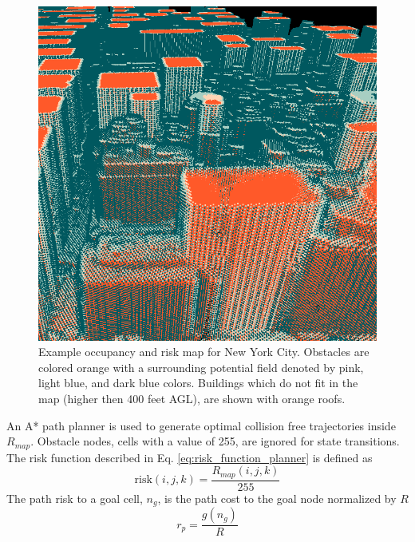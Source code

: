 \begin{figure}[ht]
  \centering
  \includegraphics[width=0.5\linewidth]{chapter_5_mapping/imgs/voxel_map_ny_2.png}
  \caption[Occupancy map of New York City]{Example occupancy and risk map for New York City. Obstacles are colored orange with a surrounding potential field denoted by pink, light blue, and dark blue colors. Buildings which do not fit in the map (higher then 400 feet AGL), are shown with orange roofs.}
  \label{fig:ch5_ny_voxel_map}
\end{figure}

An A* path planner is used to generate optimal collision free trajectories inside $R_{map}$. Obstacle nodes, cells with a value of 255, are ignored for state transitions. The risk function described in Eq. \ref{eq:risk_function_planner} is defined as
\begin{equation}
\text{risk}(i,j,k) = \frac{R_{map}(i,j,k )}{255} 
\end{equation}
The path risk to a goal cell, $n_g$, is the path cost to the goal node normalized by $R$
\begin{equation}
r_p = \frac{g(n_g)}{R} 
\end{equation}




